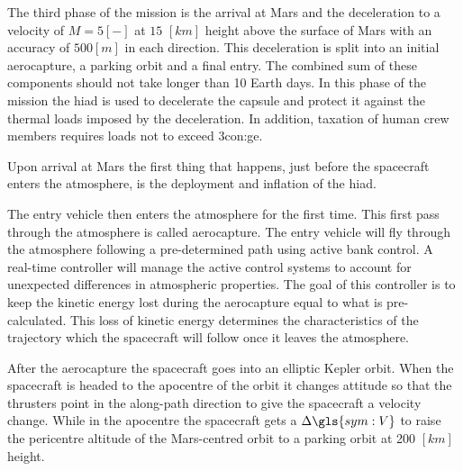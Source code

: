 The third phase of the mission is the arrival at Mars and the deceleration to a velocity of $M=5\left[-\right]$ at $15$ $\left[km\right]$ height above the surface of Mars with an accuracy of $500 \left[m\right]$ in each direction. This deceleration is split into an initial aerocapture, a parking orbit and a final entry. The combined sum of these components should not take longer than 10 Earth days. In this phase of the mission the \gls{hiad} is used to decelerate the capsule and protect it against the thermal loads imposed by the deceleration. In addition, taxation of human crew members requires loads not to exceed 3\gls{con:ge}.

Upon arrival at Mars the first thing that happens, just before the spacecraft enters the atmosphere, is the deployment and inflation of the \gls{hiad}. %

The entry vehicle then enters the atmosphere for the first time. This first pass through the atmosphere is called aerocapture. The entry vehicle will fly through the atmosphere following a pre-determined path using active bank control. A real-time controller will manage the active control systems to account for unexpected differences in atmospheric properties. The goal of this controller is to keep the kinetic energy lost during the aerocapture equal to what is pre-calculated. This loss of kinetic energy determines the characteristics of the trajectory which the spacecraft will follow once it leaves the atmosphere. %

After the aerocapture the spacecraft goes into an elliptic Kepler orbit. When the spacecraft is headed to the apocentre of the orbit it changes attitude so that the thrusters point in the along-path direction to give the spacecraft a velocity change. While in the apocentre the spacecraft gets a $\Delta\gls{sym:V}$ to raise the pericentre altitude of the Mars-centred orbit to a parking orbit at 200 $[km]$ height.

